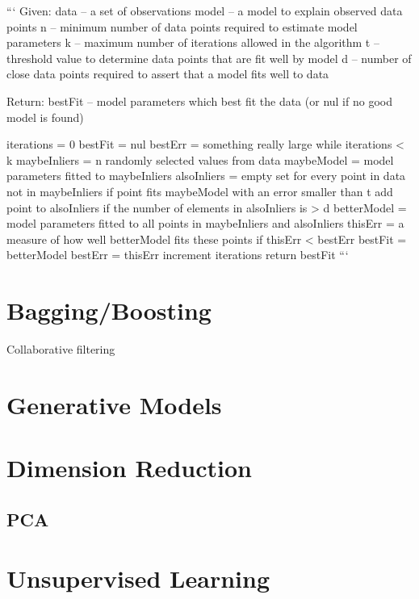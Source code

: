 ```
Given:
    data – a set of observations
    model – a model to explain observed data points
    n – minimum number of data points required to estimate model parameters
    k – maximum number of iterations allowed in the algorithm
    t – threshold value to determine data points that are fit well by model 
    d – number of close data points required to assert that a model fits well to data

Return:
    bestFit – model parameters which best fit the data (or nul if no good model is found)

iterations = 0
bestFit = nul
bestErr = something really large
while iterations < k {
    maybeInliers = n randomly selected values from data
    maybeModel = model parameters fitted to maybeInliers
    alsoInliers = empty set
    for every point in data not in maybeInliers {
        if point fits maybeModel with an error smaller than t
             add point to alsoInliers
    }
    if the number of elements in alsoInliers is > d {
        betterModel = model parameters fitted to all points in maybeInliers and alsoInliers
        thisErr = a measure of how well betterModel fits these points
        if thisErr < bestErr {
            bestFit = betterModel
            bestErr = thisErr
        }
    }
    increment iterations
}
return bestFit
```



\section{Bagging/Boosting}

Collaborative filtering

\section{Generative Models}

\section{Dimension Reduction}

\subsection{PCA}

\section{Unsupervised Learning}

